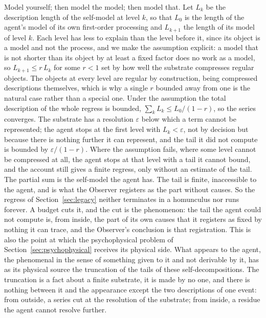 Model yourself; then model the model; then model that. Let $L_k$ be the description length of the
self-model at level $k$, so that $L_0$ is the length of the agent's model of its own first-order
processing and $L_{k+1}$ the length of its model of level $k$. Each level has less to explain than the
level before it, since its object is a model and not the process, and we make the assumption explicit:
a model that is not shorter than its object by at least a fixed factor does no work as a model, so
$L_{k+1} \le r\,L_k$ for some $r<1$ set by how well the substrate compresses regular objects. The
objects at every level are regular by construction, being compressed descriptions themselves, which is
why a single $r$ bounded away from one is the natural case rather than a special one. Under the
assumption the total description of the whole regress is bounded, $\sum_k L_k \le L_0/(1-r)$, so the
series converges. The substrate has a resolution $\varepsilon$ below which a term cannot be
represented; the agent stops at the first level with $L_k < \varepsilon$, not by decision but because
there is nothing further it can represent, and the tail it did not compute is bounded by
$\varepsilon/(1-r)$. Where the assumption fails, where some level cannot be compressed at all, the
agent stops at that level with a tail it cannot bound, and the account still gives a finite regress,
only without an estimate of the tail. The partial sum is the self-model the agent has. The tail is
finite, inaccessible to the agent, and is what the Observer registers as the part without causes. So the
regress of Section~\ref{sec:legacy} neither terminates in a homunculus nor runs forever. A budget cuts
it, and the cut is the phenomenon: the tail the agent could not compute is, from inside, the part of
its own causes that it registers as fixed by nothing it can trace, and the Observer's conclusion is
that registration. This is also the point at which the psychophysical problem of
Section~\ref{sec:psychophysical} receives its physical side. What appears to the agent, the
phenomenal in the sense of something given to it and not derivable by it, has as its physical source
the truncation of the tails of these self-decompositions. The truncation is a fact about a finite
substrate, it is made by no one, and there is nothing between it and the appearance except the two
descriptions of one event: from outside, a series cut at the resolution of the substrate; from inside,
a residue the agent cannot resolve further.


